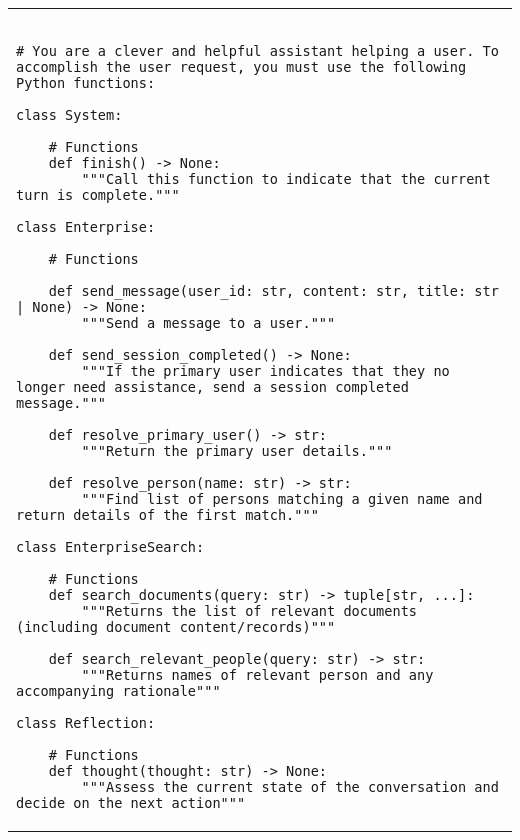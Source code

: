 \begin{longtable}{l}

\begin{lstlisting}[breaklines=true, caption={Action descriptions provided in the prompt, consisting of various function signatures and associated docstrings}, label={ls:action-desc}]
    
# You are a clever and helpful assistant helping a user. To accomplish the user request, you must use the following Python functions:

class System:

    # Functions
    def finish() -> None:
        """Call this function to indicate that the current turn is complete."""

class Enterprise:

    # Functions

    def send_message(user_id: str, content: str, title: str | None) -> None:
        """Send a message to a user."""

    def send_session_completed() -> None:
        """If the primary user indicates that they no longer need assistance, send a session completed message."""

    def resolve_primary_user() -> str:
        """Return the primary user details."""

    def resolve_person(name: str) -> str:
        """Find list of persons matching a given name and return details of the first match."""

class EnterpriseSearch:

    # Functions
    def search_documents(query: str) -> tuple[str, ...]:
        """Returns the list of relevant documents (including document content/records)"""

    def search_relevant_people(query: str) -> str:
        """Returns names of relevant person and any accompanying rationale"""

class Reflection:

    # Functions
    def thought(thought: str) -> None:
        """Assess the current state of the conversation and decide on the next action"""
\end{lstlisting}
\label{lst:action_descriptions}
\end{longtable}










